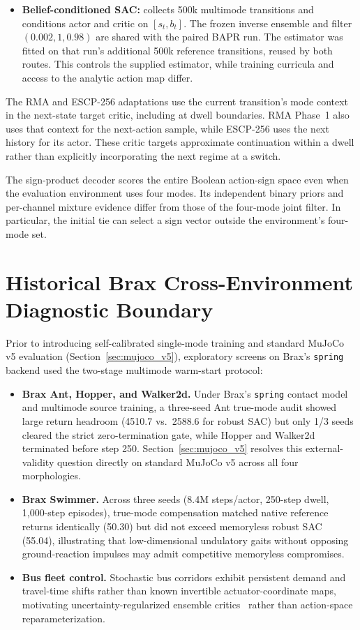 \begin{itemize}[leftmargin=*]
    \item \textbf{Belief-conditioned SAC:} collects 500k multimode transitions and conditions actor and critic on $[s_t,b_t]$. The frozen inverse ensemble and filter $(0.002,1,0.98)$ are shared with the paired BAPR run. The estimator was fitted on that run's additional 500k reference transitions, reused by both routes. This controls the supplied estimator, while training curricula and access to the analytic action map differ.
\end{itemize}

The RMA and ESCP-256 adaptations use the current transition's mode context in the next-state target critic, including at dwell boundaries. RMA Phase~1 also uses that context for the next-action sample, while ESCP-256 uses the next history for its actor. These critic targets approximate continuation within a dwell rather than explicitly incorporating the next regime at a switch.

The sign-product decoder scores the entire Boolean action-sign space even when the evaluation environment uses four modes. Its independent binary priors and per-channel mixture evidence differ from those of the four-mode joint filter. In particular, the initial tie can select a sign vector outside the environment's four-mode set.

\section{Historical Brax Cross-Environment Diagnostic Boundary}
\label{app:cross_environment}

Prior to introducing self-calibrated single-mode training and standard MuJoCo v5 evaluation (Section~\ref{sec:mujoco_v5}), exploratory screens on Brax's \texttt{spring} backend used the two-stage multimode warm-start protocol:
\begin{itemize}[leftmargin=*]
    \item \textbf{Brax Ant, Hopper, and Walker2d.} Under Brax's \texttt{spring} contact model and multimode source training, a three-seed Ant true-mode audit showed large return headroom (4510.7 vs.\ 2588.6 for robust SAC) but only 1/3 seeds cleared the strict zero-termination gate, while Hopper and Walker2d terminated before step 250. Section~\ref{sec:mujoco_v5} resolves this external-validity question directly on standard MuJoCo v5 across all four morphologies.
    \item \textbf{Brax Swimmer.} Across three seeds (8.4M steps/actor, 250-step dwell, 1,000-step episodes), true-mode compensation matched native reference returns identically (50.30) but did not exceed memoryless robust SAC (55.04), illustrating that low-dimensional undulatory gaits without opposing ground-reaction impulses may admit competitive memoryless compromises.
    \item \textbf{Bus fleet control.} Stochastic bus corridors exhibit persistent demand and travel-time shifts rather than known invertible actuator-coordinate maps, motivating uncertainty-regularized ensemble critics~\citep{Zhang2026RESAC,Zhang2026SingleAgentBus} rather than action-space reparameterization.
\end{itemize}
